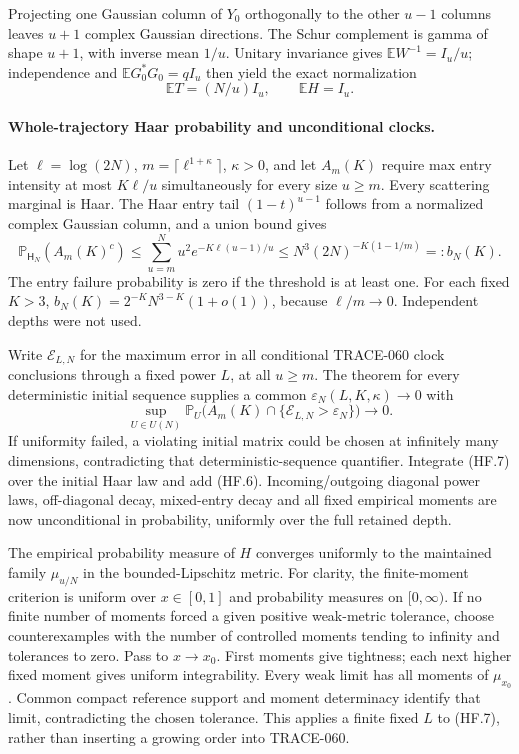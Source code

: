 Projecting one Gaussian column of $Y_0$ orthogonally to the other
$u-1$ columns leaves $u+1$ complex Gaussian directions. The Schur
complement is gamma of shape $u+1$, with inverse mean $1/u$.
Unitary invariance gives $\mathbb EW^{-1}=I_u/u$; independence and
$\mathbb EG_0^*G_0=qI_u$ then yield the exact normalization
\[
 \mathbb ET=(N/u)I_u,\qquad \mathbb EH=I_u.            \tag{HF.5}
\]

\paragraph{Whole-trajectory Haar probability and unconditional clocks.}
Let $\ell=\log(2N)$, $m=\lceil\ell^{1+\kappa}\rceil$, $\kappa>0$,
and let $A_m(K)$ require max entry intensity at most $K\ell/u$
simultaneously for every size $u\ge m$.
Every scattering marginal is Haar. The Haar entry tail
$(1-t)^{u-1}$ follows from a normalized complex Gaussian column,
and a union bound gives
\[
 \mathbb P_{\mathsf H_N}(A_m(K)^c)
 \le\sum_{u=m}^N u^2e^{-K\ell(u-1)/u}
 \le N^3(2N)^{-K(1-1/m)}=:b_N(K).                    \tag{HF.6}
\]
The entry failure probability is zero if the threshold is at least one.
For each fixed $K>3$,
$b_N(K)=2^{-K}N^{3-K}(1+o(1))$, because $\ell/m\to0$.
Independent depths were not used.

Write $\mathcal E_{L,N}$ for the maximum error in all conditional
TRACE-060 clock conclusions through a fixed power $L$, at all $u\ge m$.
The theorem for every deterministic initial sequence supplies a common
$\varepsilon_N(L,K,\kappa)\to0$ with
\[
 \sup_{U\in U(N)}
 \mathbb P_U\bigl(A_m(K)\cap
       \{\mathcal E_{L,N}>\varepsilon_N\}\bigr)\longrightarrow0.  \tag{HF.7}
\]
If uniformity failed, a violating initial matrix could be chosen at
infinitely many dimensions, contradicting that deterministic-sequence
quantifier. Integrate (HF.7) over the initial Haar law and add (HF.6).
Incoming/outgoing diagonal power laws, off-diagonal decay, mixed-entry
decay and all fixed empirical moments are now unconditional in
probability, uniformly over the full retained depth.

The empirical probability measure of $H$ converges uniformly to the
maintained family $\mu_{u/N}$ in the bounded-Lipschitz metric.
For clarity, the finite-moment criterion is uniform over $x\in[0,1]$
and probability measures on $[0,\infty)$. If no finite number of
moments forced a given positive weak-metric tolerance, choose
counterexamples with the number of controlled moments tending to infinity
and tolerances to zero. Pass to $x\to x_0$. First moments give
tightness; each next higher fixed moment gives uniform integrability.
Every weak limit has all moments of $\mu_{x_0}$. Common compact
reference support and moment determinacy identify that limit,
contradicting the chosen tolerance. This applies a finite fixed $L$
to (HF.7), rather than inserting a growing order into TRACE-060.

